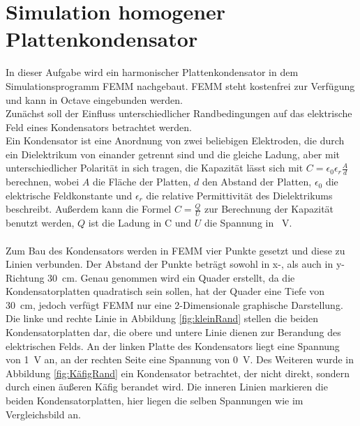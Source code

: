 \section{Simulation homogener Plattenkondensator}\label{sec:ag3_3}
In dieser Aufgabe wird ein harmonischer Plattenkondensator in dem Simulationsprogramm \glqq FEMM \grqq{} nachgebaut. FEMM steht kostenfrei zur Verfügung und kann in Octave eingebunden werden.\\
Zunächst soll der Einfluss unterschiedlicher Randbedingungen auf das elektrische Feld eines Kondensators betrachtet werden. \\
Ein Kondensator ist eine Anordnung von zwei beliebigen Elektroden, die durch ein Dielektrikum von einander getrennt sind und die gleiche Ladung, aber mit unterschiedlicher Polarität in sich tragen, die Kapazität lässt sich mit $ C = \epsilon_{0}\epsilon_{r}\frac{A}{d}$ berechnen, wobei $A$ die Fläche der Platten, $d$ den Abstand der Platten, $\epsilon_{0}$ die elektrische Feldkonstante und $\epsilon_{r}$ die relative Permittivität des Dielektrikums beschreibt. Außerdem kann die Formel $C = \frac{Q}{U}$ zur Berechnung der Kapazität benutzt werden, $Q$ ist die Ladung in \si{\coulomb} und $U$ die Spannung in \SI{}{\volt}. \\ \\
Zum Bau des Kondensators werden in FEMM vier Punkte gesetzt und diese zu Linien verbunden. Der Abstand der Punkte beträgt sowohl in x-, als auch in y-Richtung \SI{30}{\centi\meter}. Genau genommen wird ein Quader erstellt, da die Kondensatorplatten quadratisch sein sollen, hat der Quader eine Tiefe von \SI{30}{\centi\meter}, jedoch verfügt FEMM nur eine 2-Dimensionale graphische Darstellung.\\
 Die linke und rechte Linie in Abbildung \ref{fig:kleinRand} stellen die beiden Kondensatorplatten dar, die obere und untere Linie dienen zur Berandung des elektrischen Felds. An der linken Platte des Kondensators liegt eine Spannung von \SI{1}{\volt} an, an der rechten Seite eine Spannung von \SI{0}{\volt}. Des Weiteren wurde in Abbildung \ref{fig:KäfigRand} ein Kondensator betrachtet, der nicht direkt, sondern durch einen äußeren Käfig berandet wird. Die inneren Linien markieren die beiden Kondensatorplatten, hier liegen die selben Spannungen wie im Vergleichsbild an.
